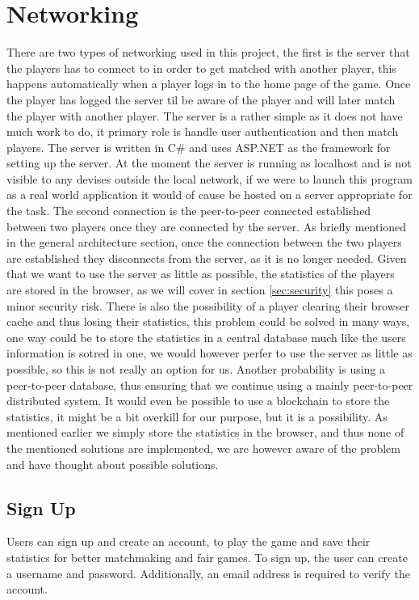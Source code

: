 \documentclass[ twoside,openright,titlepage,numbers=noenddot,headinclude,%
                footinclude=true,cleardoublepage=empty,abstractoff, %
                BCOR=5mm,paper=a4,fontsize=11pt,%
                ngerman,american,%
                ]{scrreprt}
\begin{document}
\section{Networking}
There are two types of networking used in this project, the first is the server that the players has to connect to in order to get matched with another player, this happens automatically when a player logs in to the home page of the game. Once the player has logged the server til be aware of the player and will later match the player with another player. The server is a rather simple as it does not have much work to do, it primary role is handle user authentication and then match players. The server is written in C\# and uses ASP.NET as the framework for setting up the server. At the moment the server is running as localhost and is not visible to any devises outside the local network, if we were to launch this program as a real world application it would of cause be hosted on a server appropriate for the task. The second connection is the peer-to-peer connected established between two players once they are connected by the server. As briefly mentioned in the general architecture section, once the connection between the two players are established they disconnects from the server, as it is no longer needed. 
Given that we want to use the server as little as possible, the statistics of the players are stored in the browser, as we will cover in section \ref{sec:security} this poses a minor security risk. There is also the possibility of a player clearing their browser cache and thus losing their statistics, this problem could be solved in many ways, one way could be to store the statistics in a central database much like the users information is sotred in one, we would however perfer to use the server as little as possible, so this is not really an option for us. Another probability is using a peer-to-peer database, thus ensuring that we continue using a mainly peer-to-peer distributed system. It would even be possible to use a blockchain to store the statistics, it might be a bit overkill for our purpose, but it is a possibility. As mentioned earlier we simply store the statistics in the browser, and thus none of the mentioned solutions are implemented, we are however aware of the problem and have thought about possible solutions.

\subsection{Sign Up}
Users can sign up and create an account, to play the game and save their statistics for better matchmaking and fair games. 
To sign up, the user can create a username and password. Additionally, an email address is required to verify the account.
\end{document}
